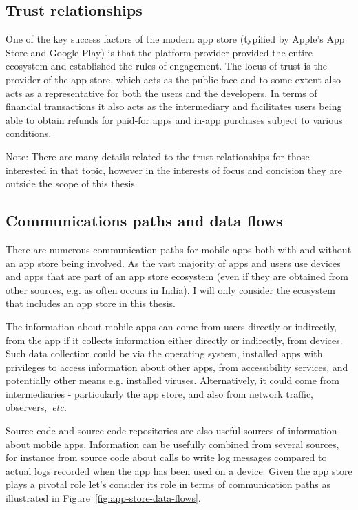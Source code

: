 \subsection{Trust relationships}
One of the key success factors of the modern app store (typified by Apple's App Store and Google Play) is that the platform provider provided the entire ecosystem and established the rules of engagement. The locus of trust is the provider of the app store, which acts as the public face and to some extent also acts as a representative for both the users and the developers. In terms of financial transactions it also acts as the intermediary and facilitates users being able to obtain refunds for paid-for apps and in-app purchases subject to various conditions. 

Note: There are many details related to the trust relationships for those interested in that topic, however in the interests of focus and concision they are outside the scope of this thesis. 

\subsection{Communications paths and data flows}
There are numerous communication paths for mobile apps both with and without an app store being involved. As the vast majority of apps and users use devices and apps that are part of an app store ecosystem (even if they are obtained from other sources, e.g. as often occurs in India). I will only consider the ecosystem that includes an app store in this thesis. 

The information about mobile apps can come from users directly or indirectly, from the app if it collects information either directly or indirectly, from devices. Such data collection could be via the operating system, installed apps with privileges to access information about other apps, from accessibility services, and potentially other means e.g. installed viruses. Alternatively, it could come from intermediaries - particularly the app store, and also from network traffic, observers,~\emph{etc.} 

Source code and source code repositories are also useful sources of information about mobile apps. Information can be usefully combined from several sources, for instance from source code about calls to write log messages compared to actual logs recorded when the app has been used on a device. Given the app store plays a pivotal role let's consider its role in terms of communication paths as illustrated in Figure~\ref{fig:app-store-data-flows}. 

